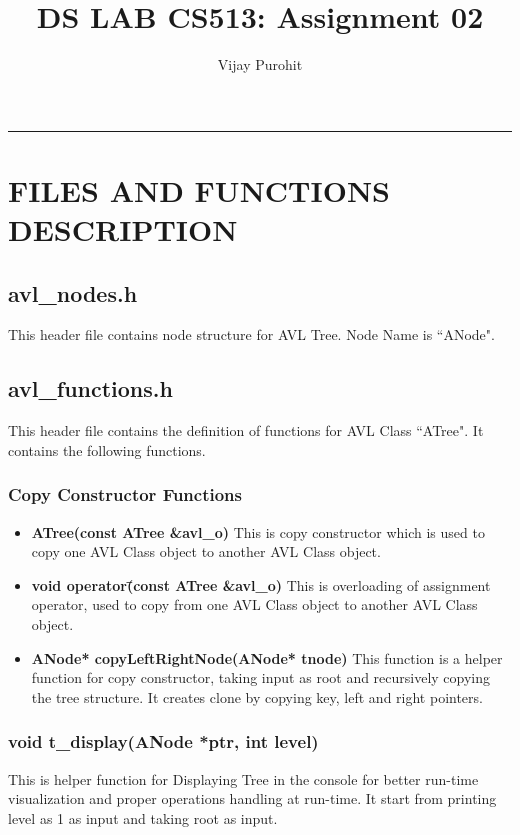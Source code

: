 \documentclass{article}
\title{DS LAB CS513: Assignment 02}
\date{}
\author{Vijay Purohit \mid 214101058}
\affil{M.Tech CSE, IITG}
\begin{document}
\maketitle
\noindent\rule{\textwidth}{0.2pt}
\tableofcontents
    \newpage
\listoffigures
    \newpage


\section{FILES AND FUNCTIONS DESCRIPTION} %
\subsection{avl\_nodes.h}
This header file contains node structure for AVL Tree. Node Name is ``ANode".

\subsection{avl\_functions.h}
This header file contains the definition of functions for AVL Class ``ATree". It contains the following functions.

\subsubsection{Copy Constructor Functions}

\begin{itemize}
\item \textbf{ATree(const ATree \&avl\_o)}\newline
This is copy constructor which is used to copy one AVL Class object to another AVL Class object.

\item \textbf{void operator\=(const ATree \&avl\_o)}\newline
This is overloading of assignment operator, used to copy from one AVL Class object to another AVL Class object.

\item \textbf{ANode* copyLeftRightNode(ANode* tnode)}\newline
This function is a helper function for copy constructor, taking input as root and recursively copying the tree structure. It creates clone by copying key, left and right pointers.
\end{itemize}

\subsubsection{void t\_display(ANode *ptr, int level)}
This is helper function for Displaying Tree in the console for better run-time visualization and proper operations handling at run-time.
It start from printing level as 1 as input and taking root as input.
\end{document}
